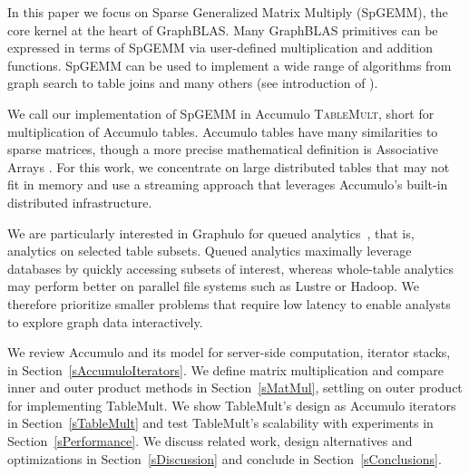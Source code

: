 
In this paper we focus on Sparse Generalized Matrix Multiply (SpGEMM), the core kernel at the heart of GraphBLAS.
Many GraphBLAS primitives can be expressed in terms of
SpGEMM via user-defined multiplication and addition functions. 
SpGEMM can be used to implement a wide range of algorithms 
from graph search \cite{kepner2011graph} to table joins \cite{cohen2009mad} 
and many others (see introduction of \cite{bulucc2010highly}).

We call our implementation of SpGEMM in Accumulo \textsc{TableMult}, short for multiplication of Accumulo tables.
Accumulo tables have many similarities to sparse matrices, though a more precise mathematical definition is Associative Arrays 
\cite{kepner2014gabb}. For this work, we concentrate on
large distributed tables that may not fit in memory and use a streaming
approach that leverages Accumulo's built-in distributed infrastructure.

We are particularly interested in Graphulo for queued analytics~\cite{Reuther09cloudcomputing}, 
that is, analytics on selected table subsets.  
Queued analytics maximally leverage  databases
by quickly accessing subsets of interest, 
whereas whole-table analytics may perform better on parallel file systems such as Lustre or Hadoop.
We therefore prioritize smaller problems that require low latency
to enable analysts to explore graph data interactively.


We review Accumulo and its model for server-side computation, iterator stacks, 
in Section~\ref{sAccumuloIterators}.
We define matrix multiplication and compare inner and outer product methods
in Section~\ref{sMatMul}, settling on outer product for implementing TableMult.
We show TableMult's design as Accumulo iterators in Section~\ref{sTableMult}
and test TableMult's scalability with experiments in Section~\ref{sPerformance}.
We discuss related work, design alternatives and optimizations in Section~\ref{sDiscussion}
and conclude in Section~\ref{sConclusions}.


